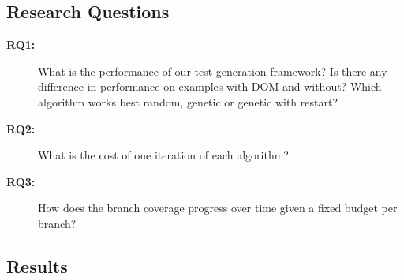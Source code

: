 \documentclass[sigconf]{acmart}
\begin{document}
\subsection{Research Questions}
\label{sub.sec.research.questions}

\begin{description}
\item[\textbf{RQ1:}] What is the performance of our test generation framework? Is there any difference in performance on examples with DOM and without?  Which algorithm works best random, genetic or genetic with restart?
\item[\textbf{RQ2:}] What is the cost of one iteration of each algorithm?
\item[\textbf{RQ3:}] How does the branch coverage progress over time given a fixed budget per branch? 
\end{description}

\subsection{Results}
\label{sub.sec.eval.results}
\end{document}
